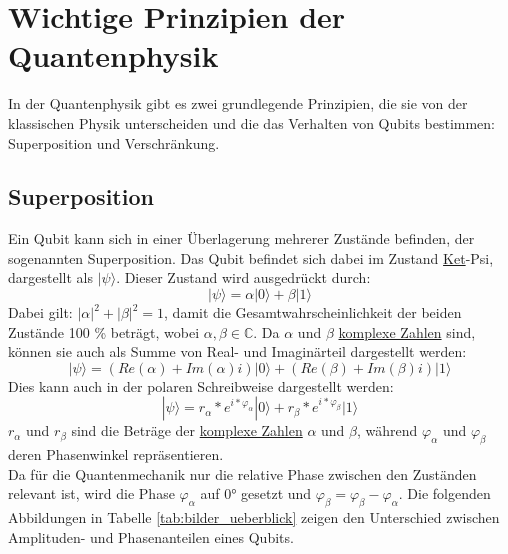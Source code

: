 \pagebreak
\section{Wichtige Prinzipien der Quantenphysik}
In der Quantenphysik gibt es zwei grundlegende Prinzipien, die sie von der klassischen Physik unterscheiden und die das Verhalten von Qubits bestimmen: Superposition und Verschränkung.
\label{sec:superposition}
\subsection{Superposition}
Ein Qubit kann sich in einer Überlagerung mehrerer Zustände befinden, der sogenannten Superposition. 
Das Qubit befindet sich dabei im Zustand \hyperlink{bra-ket-def}{Ket}-Psi, dargestellt als $|\psi\rangle$.
Dieser Zustand wird ausgedrückt durch:
\begin{equation*}
|\psi\rangle = \alpha |0\rangle + \beta |1\rangle
\end{equation*}
Dabei gilt: $|\alpha|^2 + |\beta|^2 = 1$, damit die Gesamtwahrscheinlichkeit der beiden Zustände 100 \% beträgt, 
wobei $\alpha, \beta \in \mathbb{C}$.
Da $\alpha$ und $\beta$ \hyperlink{komplexe-zahlen-def}{komplexe Zahlen} sind, können sie auch als Summe von Real- und Imaginärteil dargestellt werden:
\begin{equation*}
|\psi\rangle = (Re(\alpha)+Im(\alpha)i) |0\rangle + (Re(\beta)+Im(\beta)i) |1\rangle
\end{equation*}
Dies kann auch in der polaren Schreibweise dargestellt werden:
\begin{equation*}
|\psi\rangle = r_\alpha*e^{i*\varphi_\alpha}|0\rangle + r_\beta*e^{i*\varphi_\beta}|1\rangle
\end{equation*}
$r_\alpha$ und $r_\beta$ sind die Beträge der \hyperlink{komplexe-zahlen-def}{komplexe Zahlen} $\alpha$ und $\beta$, während $\varphi_\alpha$ und $\varphi_\beta$ deren Phasenwinkel repräsentieren.
\\
Da für die Quantenmechanik nur die relative Phase zwischen den Zuständen relevant ist, wird die Phase $\varphi_\alpha$ auf 0° gesetzt und $\varphi_\beta = \varphi_\beta - \varphi_\alpha$.
Die folgenden Abbildungen in Tabelle \ref{tab:bilder_ueberblick} zeigen den Unterschied zwischen Amplituden- und Phasenanteilen eines Qubits.
\vspace{5pt}
